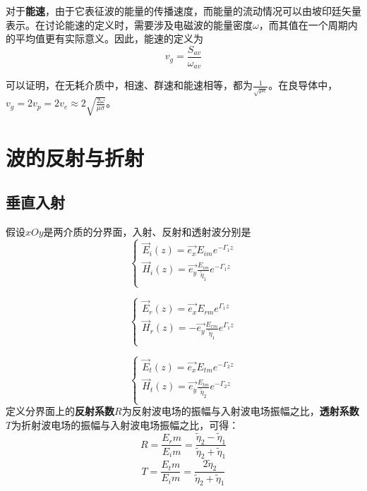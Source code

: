 \documentclass[UTF8,a4paper,11pt]{article}
\begin{document}
对于\textbf{能速}，由于它表征波的能量的传播速度，而能量的流动情况可以由坡印廷矢量表示。在讨论能速的定义时，需要涉及电磁波的能量密度$\omega$，而其值在一个周期内的平均值更有实际意义。因此，能速的定义为
\begin{equation}
v_g=\frac{S_{av}}{\omega_{av}}
\end{equation}

可以证明，在无耗介质中，相速、群速和能速相等，都为$\frac{1}{\sqrt{\mu\epsilon}}$。在良导体中，$v_g=2v_p=2v_e\approx 2\sqrt{\frac{2\omega}{\mu\sigma}}$。

\section{波的反射与折射}
\subsection{垂直入射}
假设$xOy$是两介质的分界面，入射、反射和透射波分别是
\begin{equation}
\begin{cases}
\overrightarrow{E}_i(z)=\overrightarrow{e_x}E_{im}e^{-\Gamma_1 z}\\
\overrightarrow{H}_i(z)=\overrightarrow{e_y}\frac{E_{im}}{\widetilde{\eta}_1}e^{-\Gamma_1 z}\\
\end{cases}
\end{equation}

\begin{equation}
\begin{cases}
\overrightarrow{E}_r(z)=\overrightarrow{e_x}E_{rm}e^{\Gamma_1 z}\\
\overrightarrow{H}_r(z)=-\overrightarrow{e_y}\frac{E_{rm}}{\widetilde{\eta}_1}e^{\Gamma_1 z}\\
\end{cases}
\end{equation}

\begin{equation}
\begin{cases}
\overrightarrow{E}_t(z)=\overrightarrow{e_x}E_{tm}e^{-\Gamma_2 z}\\
\overrightarrow{H}_t(z)=\overrightarrow{e_y}\frac{E_{tm}}{\widetilde{\eta}_2}e^{-\Gamma_2 z}\\
\end{cases}
\end{equation}
定义分界面上的\textbf{反射系数}$R$为反射波电场的振幅与入射波电场振幅之比，\textbf{透射系数}$T$为折射波电场的振幅与入射波电场振幅之比，可得：
\begin{equation}
R=\frac{E_rm}{E_im}=\frac{\widetilde{\eta}_2-\widetilde{\eta}_1}{\widetilde{\eta}_2+\widetilde{\eta}_1}
\end{equation}
\begin{equation}
T=\frac{E_tm}{E_im}=\frac{2\widetilde{\eta}_2}{\widetilde{\eta}_2+\widetilde{\eta}_1}
\end{equation}
\end{document}
